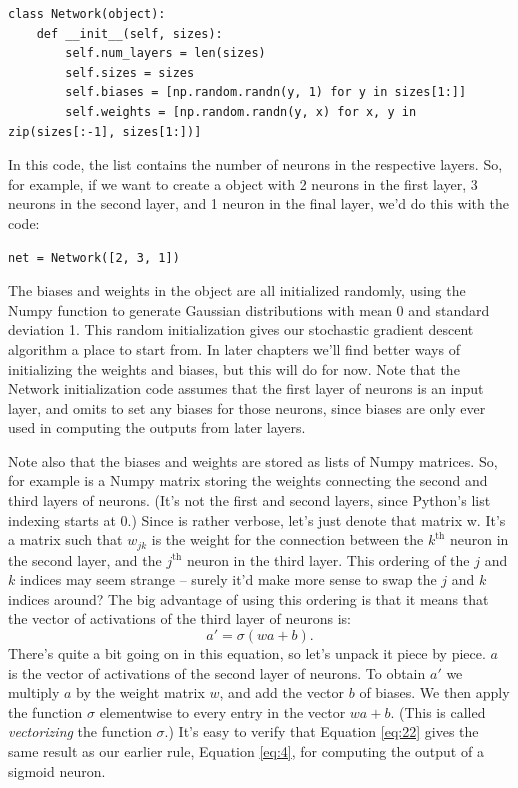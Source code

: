 \documentclass[a4paper,twoside,10pt]{book}
\begin{document}
\begin{lstlisting}
class Network(object):
	def __init__(self, sizes):
		self.num_layers = len(sizes)
		self.sizes = sizes
		self.biases = [np.random.randn(y, 1) for y in sizes[1:]]
		self.weights = [np.random.randn(y, x) for x, y in zip(sizes[:-1], sizes[1:])]
\end{lstlisting}
In this code, the list  contains the number of neurons in the respective layers. So, for example, if we want to create a  object with 2 neurons in the first layer, 3 neurons in the second layer, and 1 neuron in the final layer, we'd do this with the code:

\begin{lstlisting}
net = Network([2, 3, 1])
\end{lstlisting}
The biases and weights in the  object are all initialized randomly, using the Numpy  function to generate Gaussian distributions with mean 0 and standard deviation 1. This random initialization gives our stochastic gradient descent algorithm a place to start from. In later chapters we'll find better ways of initializing the weights and biases, but this will do for now. Note that the Network initialization code assumes that the first layer of neurons is an input layer, and omits to set any biases for those neurons, since biases are only ever used in computing the outputs from later layers.

Note also that the biases and weights are stored as lists of Numpy matrices. So, for example  is a Numpy matrix storing the weights connecting the second and third layers of neurons. (It's not the first and second layers, since Python's list indexing starts at 0.) Since  is rather verbose, let's just denote that matrix w. It's a matrix such that $w_{jk}$ is the weight for the connection between the $k^\mathrm{th}$ neuron in the second layer, and the $j^\mathrm{th}$ neuron in the third layer. This ordering of the $j$ and $k$ indices may seem strange -- surely it'd make more sense to swap the $j$ and $k$ indices around? The big advantage of using this ordering is that it means that the vector of activations of the third layer of neurons is:
\begin{equation}
	a' = \sigma(w a + b).
	\label{eq:22}
\end{equation}
There's quite a bit going on in this equation, so let's unpack it piece by piece. $a$ is the vector of activations of the second layer of neurons. To obtain $a'$ we multiply $a$ by the weight matrix $w$, and add the vector $b$ of biases. We then apply the function $\sigma$ elementwise to every entry in the vector $wa+b$. (This is called \textit{vectorizing} the function $\sigma$.) It's easy to verify that Equation \ref{eq:22} gives the same result as our earlier rule, Equation \ref{eq:4}, for computing the output of a sigmoid neuron.
\end{document}

